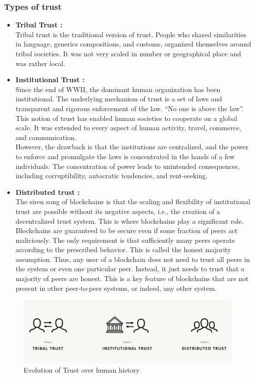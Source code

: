 \subsubsection*{Types of trust}
\begin{itemize}
    \item \textbf{Tribal Trust :} \\
    Tribal trust is the traditional version of trust. People who shared similarities in language, generics compositions, and customs, organized themselves around tribal societies. It was not very scaled in number or geographical place and was rather local. 
    \item  \textbf{Institutional Trust :} \\
    Since the end of WWII, the dominant human organization has been institutional. The underlying mechanism of trust is a set of laws and transparent and rigorous enforcement of the law. “No one is above the law”.\\
    This notion of trust has enabled human societies to cooperate on a global scale. It was extended to every aspect of human activity, travel, commerce, and communication.\\
    However, the drawback is that the institutions are centralized, and the power to enforce and promulgate the laws is concentrated in the hands of a few individuals. The concentration of power leads to unintended consequences, including corruptibility, autocratic tendencies, and rent-seeking.
    \item \textbf{Distributed trust :} \\
    The siren song of blockchains is that the scaling and flexibility of institutional
    trust are possible without its negative aspects, i.e., the creation of a decentralized trust
    system. This is where blockchains play a significant role. \\
    Blockchains are guaranteed to be secure even if some fraction of peers act maliciously. The
    only requirement is that sufficiently many peers operate according to the prescribed behavior. This
    is called the honest majority assumption. Thus, any user of a blockchain does not need to trust
    all peers in the system or even one particular peer. Instead, it just needs to trust that a majority
    of peers are honest. This is a key feature of blockchains that are not present in other peer-to-peer
    systems, or indeed, any other system.
\end{itemize}
\begin{figure}
    \centering
    \includegraphics[width=0.7\linewidth]{Fig/01/F1}
    \caption{Evolution of Trust over human history}
    \label{fig:f1}
\end{figure}

